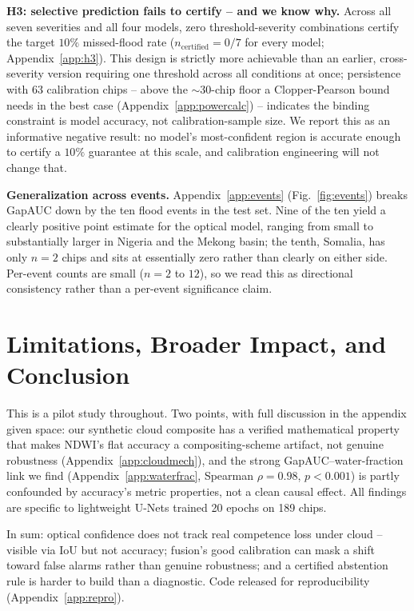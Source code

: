 \documentclass{article}
\begin{document}
\textbf{H3: selective prediction fails to certify -- and we know why.} Across all seven severities and all four models, zero threshold-severity combinations certify the target $10\%$ missed-flood rate ($n_{\text{certified}}=0/7$ for every model; Appendix~\ref{app:h3}). This design is strictly more achievable than an earlier, cross-severity version requiring one threshold across all conditions at once; persistence with $63$ calibration chips -- above the $\sim\!30$-chip floor a Clopper-Pearson bound needs in the best case (Appendix~\ref{app:powercalc}) -- indicates the binding constraint is model accuracy, not calibration-sample size. We report this as an informative negative result: no model's most-confident region is accurate enough to certify a $10\%$ guarantee at this scale, and calibration engineering will not change that.

\textbf{Generalization across events.} Appendix~\ref{app:events} (Fig.~\ref{fig:events}) breaks GapAUC down by the ten flood events in the test set. Nine of the ten yield a clearly positive point estimate for the optical model, ranging from small to substantially larger in Nigeria and the Mekong basin; the tenth, Somalia, has only $n{=}2$ chips and sits at essentially zero rather than clearly on either side. Per-event counts are small ($n{=}2$ to $12$), so we read this as directional consistency rather than a per-event significance claim.

\section{Limitations, Broader Impact, and Conclusion}
\label{sec:limitations}
This is a pilot study throughout. Two points, with full discussion in the appendix given space: our synthetic cloud composite has a verified mathematical property that makes NDWI's flat accuracy a compositing-scheme artifact, not genuine robustness (Appendix~\ref{app:cloudmech}), and the strong GapAUC--water-fraction link we find (Appendix~\ref{app:waterfrac}, Spearman $\rho=0.98$, $p<0.001$) is partly confounded by accuracy's metric properties, not a clean causal effect. All findings are specific to lightweight U-Nets trained 20 epochs on 189 chips.

In sum: optical confidence does not track real competence loss under cloud -- visible via IoU but not accuracy; fusion's good calibration can mask a shift toward false alarms rather than genuine robustness; and a certified abstention rule is harder to build than a diagnostic. Code released for reproducibility (Appendix~\ref{app:repro}).
\end{document}
